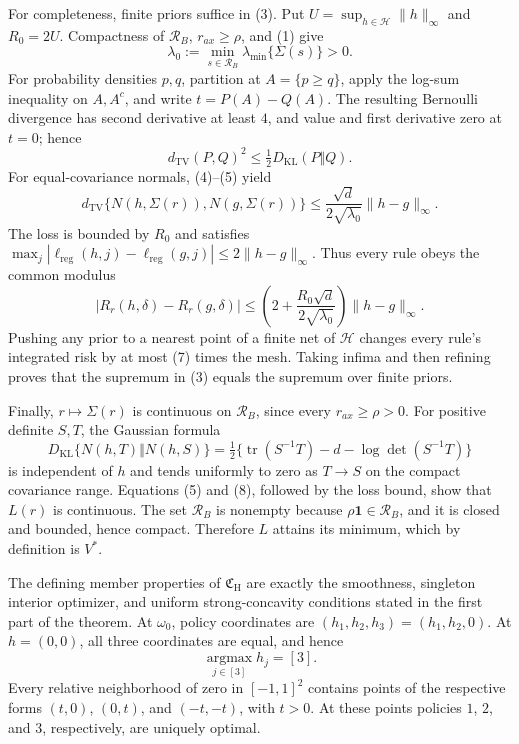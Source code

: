 For completeness, finite priors suffice in (3).  Put \(U=\sup_{h\in\mathcal H}\lVert h\rVert_\infty\) and \(R_0=2U\).  Compactness of \(\mathcal R_B\), \(r_{ax}\geq\rho\), and (1) give
\[
 \lambda_0:=\min_{s\in\mathcal R_B}\lambda_{\min}\{\Sigma(s)\}>0. \tag{4}
\]
For probability densities \(p,q\), partition at \(A=\{p\geq q\}\), apply the log-sum inequality on \(A,A^c\), and write \(t=P(A)-Q(A)\).  The resulting Bernoulli divergence has second derivative at least \(4\), and value and first derivative zero at \(t=0\); hence
\[
 d_{\mathrm{TV}}(P,Q)^2\leq\tfrac12D_{\mathrm{KL}}(P\Vert Q).        \tag{5}
\]
For equal-covariance normals, (4)--(5) yield
\[
 d_{\mathrm{TV}}\{N(h,\Sigma(r)),N(g,\Sigma(r))\}
 \leq\frac{\sqrt d}{2\sqrt{\lambda_0}}\lVert h-g\rVert_\infty.    \tag{6}
\]
The loss is bounded by \(R_0\) and satisfies \(\max_j|\ell_{\mathrm{reg}}(h,j)-\ell_{\mathrm{reg}}(g,j)|\leq2\lVert h-g\rVert_\infty\).  Thus every rule obeys the common modulus
\[
 |R_r(h,\delta)-R_r(g,\delta)|
 \leq\left(2+\frac{R_0\sqrt d}{2\sqrt{\lambda_0}}\right)
 \lVert h-g\rVert_\infty.                                          \tag{7}
\]
Pushing any prior to a nearest point of a finite net of \(\mathcal H\) changes every rule's integrated risk by at most (7) times the mesh.  Taking infima and then refining proves that the supremum in (3) equals the supremum over finite priors.

Finally, \(r\mapsto\Sigma(r)\) is continuous on \(\mathcal R_B\), since every \(r_{ax}\geq\rho>0\).  For positive definite \(S,T\), the Gaussian formula
\[
 D_{\mathrm{KL}}\{N(h,T)\Vert N(h,S)\}
 =\tfrac12\{\operatorname{tr}(S^{-1}T)-d-\log\det(S^{-1}T)\}        \tag{8}
\]
is independent of \(h\) and tends uniformly to zero as \(T\to S\) on the compact covariance range.  Equations (5) and (8), followed by the loss bound, show that \(L(r)\) is continuous.  The set \(\mathcal R_B\) is nonempty because \(\rho\mathbf1\in\mathcal R_B\), and it is closed and bounded, hence compact.  Therefore \(L\) attains its minimum, which by definition is \(V^*\).

The defining member properties of \(\mathfrak C_{\mathrm H}\) are exactly the smoothness, singleton interior optimizer, and uniform strong-concavity conditions stated in the first part of the theorem.  At \(\omega_0\), policy coordinates are \((h_1,h_2,h_3)=(h_1,h_2,0)\).  At \(h=(0,0)\), all three coordinates are equal, and hence
\[
 \operatorname*{argmax}_{j\in[3]}h_j=[3].                            \tag{1}
\]
Every relative neighborhood of zero in \([-1,1]^2\) contains points of the respective forms \((t,0)\), \((0,t)\), and \((-t,-t)\), with \(t>0\).  At these points policies \(1\), \(2\), and \(3\), respectively, are uniquely optimal.

